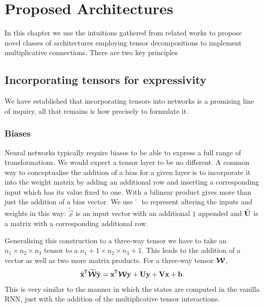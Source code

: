 
\chapter{Proposed Architectures}\label{C:arch}
In this chapter we use the intuitions gathered from related works to propose novel classes of
architectures employing tensor decompositions to implement multiplicative connections. There are
two key principles 

\section{Incorporating tensors for expressivity}
We have established that incorporating tensors into networks is a promising line of inquiry, all that
remains is how precisely to formulate it.

\subsection{Biases}
Neural networks typically require biases to be able to express a full range of transformations. We would
expect a tensor layer to be no different. A common way to conceptualise the addition of a bias for a
given layer is to incorporate it into the weight matrix by adding an additional row and inserting a
corresponding input which has its value fixed to one. With a bilinear product gives more than
just the addition of a bias vector. We use \(\tilde{\phantom{x}}\) to represent altering the inputs
and weights in this way: \(\tilde{\vec{x}}\) is an input vector with an additional \(1\) appended
and \(\tilde{\mathbf{U}}\) is a matrix with a corresponding additional row.

Generalising this construction to a three-way tensor we have to take an \(n_1 \times n_2 \times n_3\)
tensor to a \(n_1 + 1 \times n_2 \times n_3 +1\). This leads to the addition of a vector as well as
two more matrix products. For a three-way tensor \(\bm{\mathcal{W}}\),
\begin{equation}\label{eq:tensorbias}
	\tilde{\mathbf{x}}^{\mkern-1.5mu\mathsf{T}}\widetilde{\bm{\mathcal{W}}}\tilde{\mathbf{y}}
	= \mathbf{x}^{\mkern-1.5mu\mathsf{T}}\bm{\mathcal{W}}\mathbf{y} + \mathbf{U}\mathbf{y} + \mathbf{V}\mathbf{x} + \mathbf{b}.
\end{equation} This is very similar to the manner in which the states are computed in the vanilla
RNN, just with the addition of the multiplicative tensor interactions.

